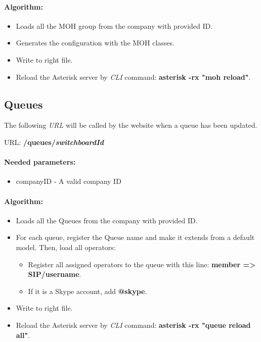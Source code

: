 \paragraph{Algorithm:}
\begin{itemize}
	\item Loads all the MOH group from the company with provided ID.
	\item Generates the configuration with the MOH classes. 
	\item Write to right file.
	\item Reload the Asterisk server by \textit{CLI} command: \textbf{asterisk -rx "moh reload"}.

\end{itemize}




\subsection{Queues}
The following \textit{URL} will be called by the website when a queue has been updated.
\newline


URL: \textbf{/queues/{\textit{switchboardId}}}

\paragraph{Needed parameters:}
\begin{itemize}
\item {companyID} - A valid company ID
\end{itemize}


\paragraph{Algorithm:}
\begin{itemize}
	\item Loads all the Queues from the company with provided ID.
	\item For each queue, register the Queue name and make it extends from a default model. Then, load all operators:
	\begin{itemize}
		\item Register all assigned operators to the queue with this line: \textbf{member => SIP/username}.
		\item If it is a Skype account, add \textbf{@skype}.
\end{itemize}	 
	\item Write to right file.
	\item Reload the Asterisk server by \textit{CLI} command: \textbf{asterisk -rx "queue reload all"}.

\end{itemize}





